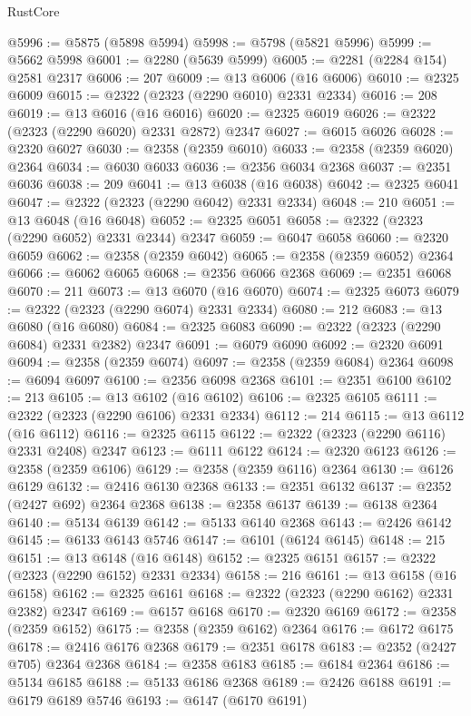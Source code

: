 \begin{lexlean}{RustCore}
\begin{coremodule}
@5996 := @5875 (@5898 @5994)
@5998 := @5798 (@5821 @5996)
@5999 := @5662 @5998
@6001 := @2280 (@5639 @5999)
@6005 := @2281 (@2284 @154) @2581 @2317
@6006 := 207
@6009 := @13 @6006 (@16 @6006)
@6010 := @2325 @6009
@6015 := @2322 (@2323 (@2290 @6010) @2331 @2334)
@6016 := 208
@6019 := @13 @6016 (@16 @6016)
@6020 := @2325 @6019
@6026 := @2322 (@2323 (@2290 @6020) @2331 @2872) @2347
@6027 := @6015 @6026
@6028 := @2320 @6027
@6030 := @2358 (@2359 @6010)
@6033 := @2358 (@2359 @6020) @2364
@6034 := @6030 @6033
@6036 := @2356 @6034 @2368
@6037 := @2351 @6036
@6038 := 209
@6041 := @13 @6038 (@16 @6038)
@6042 := @2325 @6041
@6047 := @2322 (@2323 (@2290 @6042) @2331 @2334)
@6048 := 210
@6051 := @13 @6048 (@16 @6048)
@6052 := @2325 @6051
@6058 := @2322 (@2323 (@2290 @6052) @2331 @2344) @2347
@6059 := @6047 @6058
@6060 := @2320 @6059
@6062 := @2358 (@2359 @6042)
@6065 := @2358 (@2359 @6052) @2364
@6066 := @6062 @6065
@6068 := @2356 @6066 @2368
@6069 := @2351 @6068
@6070 := 211
@6073 := @13 @6070 (@16 @6070)
@6074 := @2325 @6073
@6079 := @2322 (@2323 (@2290 @6074) @2331 @2334)
@6080 := 212
@6083 := @13 @6080 (@16 @6080)
@6084 := @2325 @6083
@6090 := @2322 (@2323 (@2290 @6084) @2331 @2382) @2347
@6091 := @6079 @6090
@6092 := @2320 @6091
@6094 := @2358 (@2359 @6074)
@6097 := @2358 (@2359 @6084) @2364
@6098 := @6094 @6097
@6100 := @2356 @6098 @2368
@6101 := @2351 @6100
@6102 := 213
@6105 := @13 @6102 (@16 @6102)
@6106 := @2325 @6105
@6111 := @2322 (@2323 (@2290 @6106) @2331 @2334)
@6112 := 214
@6115 := @13 @6112 (@16 @6112)
@6116 := @2325 @6115
@6122 := @2322 (@2323 (@2290 @6116) @2331 @2408) @2347
@6123 := @6111 @6122
@6124 := @2320 @6123
@6126 := @2358 (@2359 @6106)
@6129 := @2358 (@2359 @6116) @2364
@6130 := @6126 @6129
@6132 := @2416 @6130 @2368
@6133 := @2351 @6132
@6137 := @2352 (@2427 @692) @2364 @2368
@6138 := @2358 @6137
@6139 := @6138 @2364
@6140 := @5134 @6139
@6142 := @5133 @6140 @2368
@6143 := @2426 @6142
@6145 := @6133 @6143 @5746
@6147 := @6101 (@6124 @6145)
@6148 := 215
@6151 := @13 @6148 (@16 @6148)
@6152 := @2325 @6151
@6157 := @2322 (@2323 (@2290 @6152) @2331 @2334)
@6158 := 216
@6161 := @13 @6158 (@16 @6158)
@6162 := @2325 @6161
@6168 := @2322 (@2323 (@2290 @6162) @2331 @2382) @2347
@6169 := @6157 @6168
@6170 := @2320 @6169
@6172 := @2358 (@2359 @6152)
@6175 := @2358 (@2359 @6162) @2364
@6176 := @6172 @6175
@6178 := @2416 @6176 @2368
@6179 := @2351 @6178
@6183 := @2352 (@2427 @705) @2364 @2368
@6184 := @2358 @6183
@6185 := @6184 @2364
@6186 := @5134 @6185
@6188 := @5133 @6186 @2368
@6189 := @2426 @6188
@6191 := @6179 @6189 @5746
@6193 := @6147 (@6170 @6191)

\end{coremodule}
\end{lexlean}
